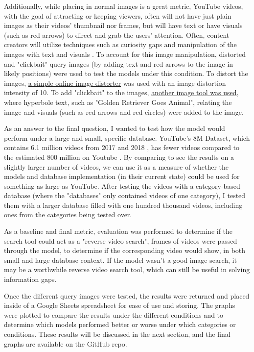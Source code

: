 \documentclass[10pt,twocolumn]{article}
\begin{document}
Additionally, while placing in normal images is a great metric, YouTube videos, with the goal of attracting or keeping viewers, often will not have just plain images as their videos' thumbnail nor frames, but will have text or have visuals (such as red arrows) to direct and grab the users' attention. Often, content creators will utilize techniques such as curiosity gaps and manipulation of the images with text and visuals \cite{Mowar2021}. To account for this image manipulation, distorted and "clickbait" query images (by adding text and red arrows to the image in likely positions) were used to test the models under this condition. To distort the images, \href{https://www.imgonline.com.ua/eng/picture-distortion.php}{a simple online image distorter} was used with an image distortion intensity of 10. To add "clickbait" to the images, \href{https://www.visualwatermark.com/add-text-to-photos/}{another image tool was used}, where hyperbole text, such as "Golden Retriever Goes Animal", relating the image and visuals (such as red arrows and red circles) were added to the image.

As an answer to the final question, I wanted to test how the model would perform under a large and small, specific database. YouTube’s 8M Dataset, which contains 6.1 million videos from 2017 and 2018 \cite{googleYT8M}, has fewer videos compared to the estimated 800 million on Youtube \cite{EarthWeb2022}. By comparing to see the results on a slightly larger number of videos, we can use it as a measure of whether the models and database implementation (in their current state) could be used for something as large as YouTube. After testing the videos with a category-based database (where the "databases" only contained videos of one category), I tested them with a larger database filled with one hundred thousand videos, including ones from the categories being tested over. 

As a baseline and final metric, evaluation was performed to determine if the search tool could act as a "reverse video search", frames of videos were passed through the model, to determine if the corresponding video would show, in both small and large database context. If the model wasn't a good image search, it may be a worthwhile reverse video search tool, which can still be useful in solving information gaps.

Once the different query images were tested, the results were returned and placed inside of a Google Sheets spreadsheet for ease of use and storing. The graphs were plotted to compare the results under the different conditions and to determine which models performed better or worse under which categories or conditions. These results will be discussed in the next section, and the final graphs are available on the GitHub repo.
\end{document}
